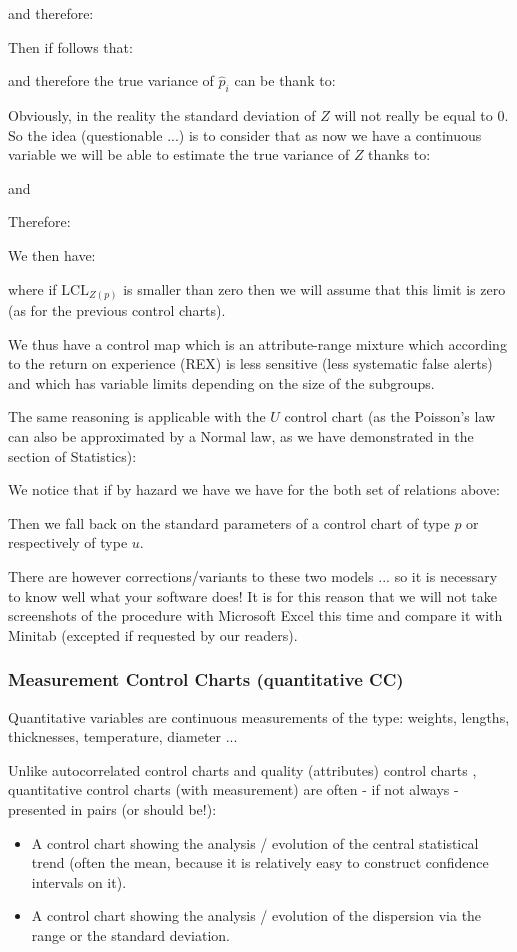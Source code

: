 	and therefore:
	
 	Then if follows that:
 	
 	and therefore the true variance of $\hat{p}_i$ can be thank to:
	
	Obviously, in the reality the standard deviation of $Z$ will not really be equal to $0$. So the idea (questionable ...) is to consider that as now we have a continuous variable we will be able to estimate the true variance of $Z$ thanks to:
	
	and
	
	Therefore:
	
	We then have:
	
	where if $\text{LCL}_{Z(p)}$ is smaller than zero then we will assume that this limit is zero (as for the previous control charts).
	
	We thus have a control map which is an attribute-range mixture which according to the return on experience (REX) is less sensitive (less systematic false alerts) and which has variable limits depending on the size of the subgroups.

	The same reasoning is applicable with the $U$ control chart (as the Poisson's law can also be approximated by a Normal law, as we have demonstrated in the section of Statistics):
	
	We notice that if by hazard we have we have for the both set of relations above:
	
 	Then we fall back on the standard parameters of a control chart of type $p$ or respectively of type $u$.	

	There are however corrections/variants to these two models ... so it is necessary to know well what your software does! It is for this reason that we will not take screenshots of the procedure with Microsoft Excel this time and compare it with Minitab (excepted if requested by our readers).
	
	\subsubsection{Measurement Control Charts (quantitative CC)}
	Quantitative variables are continuous measurements of the type: weights, lengths, thicknesses, temperature, diameter ...

	Unlike autocorrelated control charts and quality (attributes) control charts , quantitative control charts (with measurement) are often - if not always - presented in pairs (or should be!):
	\begin{itemize}
		\item A control chart showing the analysis / evolution of the central statistical trend (often the mean, because it is relatively easy to construct confidence intervals on it).

		\item A control chart showing the analysis / evolution of the dispersion via the range or the standard deviation.
	\end{itemize}

